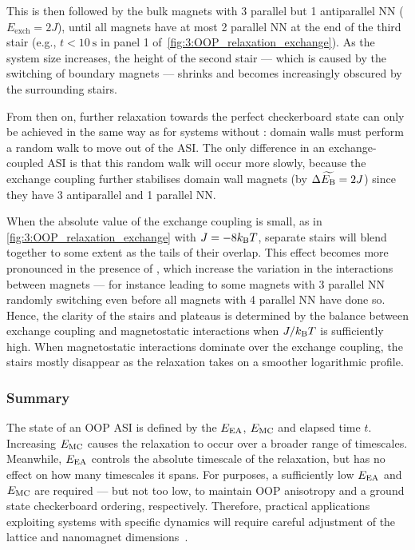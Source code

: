 This is then followed by the bulk magnets with 3 parallel but 1 antiparallel NN ($E_\mathrm{exch} = 2J$), until all magnets have at most 2 parallel NN at the end of the third stair (e.g., $t < \SI{10}{\second}$ in panel 1 of~\cref{fig:3:OOP_relaxation_exchange}).
As the system size increases, the height of the second stair --- which is caused by the switching of boundary magnets --- shrinks and becomes increasingly obscured by the surrounding stairs. \par
From then on, further relaxation towards the perfect checkerboard state can only be achieved in the same way as for systems without : domain walls must perform a random walk to move out of the ASI.
The only difference in an exchange-coupled ASI is that this random walk will occur more slowly, because the exchange coupling further stabilises domain wall magnets (by $\Delta \widetilde{E_\mathrm{B}} = 2J$) since they have 3 antiparallel and 1 parallel NN. \par
When the absolute value of the exchange coupling is small, as in \cref{fig:3:OOP_relaxation_exchange} with $J=-8\kBT$, separate stairs will blend together to some extent as the tails of their  overlap.
This effect becomes more pronounced in the presence of , which increase the variation in the interactions between magnets --- for instance leading to some magnets with 3 parallel NN randomly switching even before all magnets with 4 parallel NN have done so.
Hence, the clarity of the stairs and plateaus is determined by the balance between exchange coupling and magnetostatic interactions when $J/\kBT$ is sufficiently high.
When magnetostatic interactions dominate over the exchange coupling, the stairs mostly disappear as the relaxation takes on a smoother logarithmic profile.

\subsubsection{Summary}
The state of an OOP ASI is defined by the  $E_\mathrm{EA}$,  $E_\mathrm{MC}$ and elapsed time $t$.
Increasing $E_\mathrm{MC}$ causes the relaxation to occur over a broader range of timescales.
Meanwhile, $E_\mathrm{EA}$ controls the absolute timescale of the relaxation, but has no effect on how many timescales it spans.
For  purposes, a sufficiently low $E_\mathrm{EA}$ and $E_\mathrm{MC}$ are required --- but not too low, to maintain OOP anisotropy and a ground state checkerboard ordering, respectively.
Therefore, practical applications exploiting systems with specific dynamics will require careful adjustment of the lattice and nanomagnet dimensions~\cite{KUR-24}.

